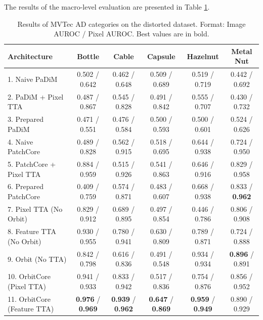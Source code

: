 \documentclass{article}
\begin{document}
	The results of the macro-level evaluation are presented in Table \ref{tbl:full_results}.
	
	\begin{table}[t]
		\centering
		\caption{Results of MVTec AD categories on the distorted dataset. Format: Image AUROC / Pixel AUROC. Best values are in bold.}\label{tbl:full_results}
		
		\begin{tabular}{@{} l ccccc @{}}
			\toprule
			\textbf{Architecture} & \textbf{Bottle} & \textbf{Cable} & \textbf{Capsule} & \textbf{Hazelnut} & \textbf{Metal Nut} \\
			\midrule
			1. Naive PaDiM & 0.502 / 0.642 & 0.462 / 0.648 & 0.509 / 0.689 & 0.519 / 0.719 & 0.442 / 0.692 \\
			2. PaDiM + Pixel TTA & 0.487 / 0.867 & 0.545 / 0.828 & 0.491 / 0.842 & 0.555 / 0.707 & 0.430 / 0.732 \\
			3. Prepared PaDiM & 0.471 / 0.551 & 0.476 / 0.584 & 0.500 / 0.593 & 0.500 / 0.601 & 0.524 / 0.626 \\
			4. Naive PatchCore & 0.489 / 0.828 & 0.562 / 0.915 & 0.518 / 0.695 & 0.644 / 0.938 & 0.724 / 0.950 \\
			5. PatchCore + Pixel TTA & 0.884 / 0.959 & 0.515 / 0.926 & 0.541 / 0.863 & 0.646 / 0.916 & 0.829 / 0.958 \\
			6. Prepared PatchCore & 0.409 / 0.759 & 0.574 / 0.871 & 0.483 / 0.607 & 0.668 / 0.938 & 0.833 / \textbf{0.962} \\
			7. Pixel TTA (No Orbit) & 0.829 / 0.912 & 0.689 / 0.895 & 0.497 / 0.854 & 0.446 / 0.786 & 0.806 / 0.908 \\
			8. Feature TTA (No Orbit) & 0.930 / 0.955 & 0.780 / 0.941 & 0.630 / 0.809 & 0.789 / 0.871 & 0.724 / 0.888 \\
			9. Orbit (No TTA) & 0.842 / 0.798 & 0.616 / 0.836 & 0.491 / 0.548 & 0.934 / 0.934 & \textbf{0.896} / 0.891 \\
			10. OrbitCore (Pixel TTA) & 0.941 / 0.933 & 0.833 / 0.942 & 0.517 / 0.836 & 0.754 / 0.876 & 0.856 / 0.952 \\
			11. OrbitCore (Feature TTA)& \textbf{0.976} / \textbf{0.969} & \textbf{0.939} / \textbf{0.962} & \textbf{0.647} / \textbf{0.869} & \textbf{0.959} / \textbf{0.949} & 0.890 / 0.929 \\
			\bottomrule
		\end{tabular}
		
		\vspace{1.5em}
		

\end{table}
\end{document}
